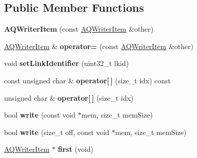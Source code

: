 \subsection*{Public Member Functions}
\begin{DoxyCompactItemize}
\item 
{\bfseries A\+Q\+Writer\+Item} (const \hyperlink{class_a_q_writer_item}{A\+Q\+Writer\+Item} \&other)\hypertarget{class_a_q_writer_item_afb89ea3ad90a751066342f136fe4b2fd}{}\label{class_a_q_writer_item_afb89ea3ad90a751066342f136fe4b2fd}

\item 
\hyperlink{class_a_q_writer_item}{A\+Q\+Writer\+Item} \& {\bfseries operator=} (const \hyperlink{class_a_q_writer_item}{A\+Q\+Writer\+Item} \&other)\hypertarget{class_a_q_writer_item_a626754df58bf7442942ffcde296aac36}{}\label{class_a_q_writer_item_a626754df58bf7442942ffcde296aac36}

\item 
void {\bfseries set\+Link\+Identifier} (uint32\+\_\+t lkid)\hypertarget{class_a_q_writer_item_a52f19448fb3ca5fd9e1afbeb7d60027a}{}\label{class_a_q_writer_item_a52f19448fb3ca5fd9e1afbeb7d60027a}

\item 
const unsigned char \& {\bfseries operator\mbox{[}$\,$\mbox{]}} (size\+\_\+t idx) const \hypertarget{class_a_q_writer_item_ab025ce2d8f8ec5716b97a6d8cfd6056a}{}\label{class_a_q_writer_item_ab025ce2d8f8ec5716b97a6d8cfd6056a}

\item 
unsigned char \& {\bfseries operator\mbox{[}$\,$\mbox{]}} (size\+\_\+t idx)\hypertarget{class_a_q_writer_item_a4b1cf82c67ef0f1aa6a52786124d2d64}{}\label{class_a_q_writer_item_a4b1cf82c67ef0f1aa6a52786124d2d64}

\item 
bool {\bfseries write} (const void $\ast$mem, size\+\_\+t mem\+Size)\hypertarget{class_a_q_writer_item_a06d5dcc6535fbbc3f06bc2a56ed2ae18}{}\label{class_a_q_writer_item_a06d5dcc6535fbbc3f06bc2a56ed2ae18}

\item 
bool {\bfseries write} (size\+\_\+t off, const void $\ast$mem, size\+\_\+t mem\+Size)\hypertarget{class_a_q_writer_item_a108cb5fa1ed80fd8dab609581283010d}{}\label{class_a_q_writer_item_a108cb5fa1ed80fd8dab609581283010d}

\item 
\hyperlink{class_a_q_writer_item}{A\+Q\+Writer\+Item} $\ast$ {\bfseries first} (void)\hypertarget{class_a_q_writer_item_a8efccaf791f519033681a23cbce1ed0a}{}\label{class_a_q_writer_item_a8efccaf791f519033681a23cbce1ed0a}


\end{DoxyCompactItemize}
